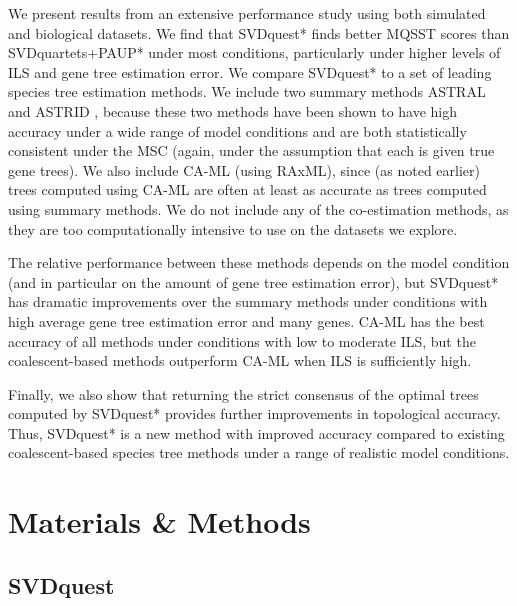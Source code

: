 We present results from an extensive performance study using both simulated and biological datasets.
We find that SVDquest* finds better MQSST scores than SVDquartets+PAUP* under most
conditions, particularly under higher levels of ILS and gene tree
estimation error.  
We compare SVDquest* to a set of leading species tree estimation 
methods. We include two summary methods
ASTRAL \cite{ASTRAL,mirarab2015astral} and
ASTRID \cite{vachaspati2015astrid}, because these two methods have been shown to
have high accuracy under a wide range of model conditions and are both
statistically consistent under the MSC {(again, under the assumption that each is given true gene trees)}.
We also include  CA-ML (using RAxML), since (as noted earlier)  trees computed using CA-ML are often at least as accurate as
trees computed using summary methods. 
We do not include any of the co-estimation methods, as they are too computationally intensive to use
on the datasets we explore.

The relative performance between these methods depends on the
model condition (and in particular on the amount of gene tree estimation 
error), but SVDquest*  has dramatic improvements over the summary
methods under conditions with high
average gene tree estimation error and many genes.  
CA-ML has the best
accuracy of all methods under conditions with low to moderate ILS, but
the coalescent-based methods outperform CA-ML when ILS is sufficiently
high. 

Finally, we also show that returning the strict consensus of the optimal trees
computed by SVDquest* provides further improvements in topological accuracy. 
Thus, SVDquest* is a new method with improved accuracy
compared to existing coalescent-based species tree methods under a
range of realistic model conditions.


   

\section{Materials \& Methods}

\subsection{SVDquest}

